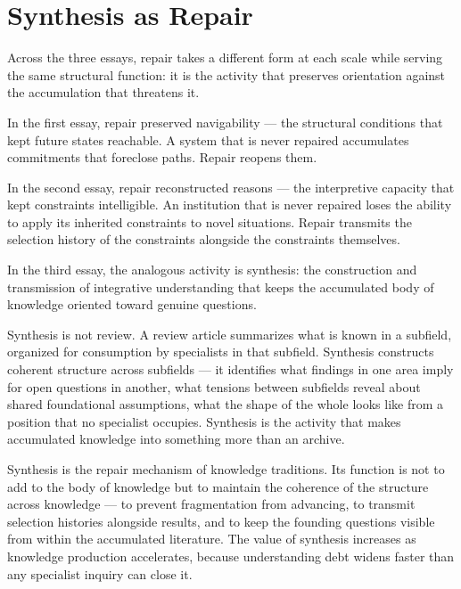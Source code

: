 \section{Synthesis as Repair}

Across the three essays, repair takes a different form at each scale while
serving the same structural function: it is the activity that preserves
orientation against the accumulation that threatens it.

In the first essay, repair preserved navigability --- the structural conditions
that kept future states reachable. A system that is never repaired accumulates
commitments that foreclose paths. Repair reopens them.

In the second essay, repair reconstructed reasons --- the interpretive capacity
that kept constraints intelligible. An institution that is never repaired
loses the ability to apply its inherited constraints to novel situations.
Repair transmits the selection history of the constraints alongside the
constraints themselves.

In the third essay, the analogous activity is synthesis: the construction
and transmission of integrative understanding that keeps the accumulated body
of knowledge oriented toward genuine questions.

Synthesis is not review. A review article summarizes what is known in a
subfield, organized for consumption by specialists in that subfield. Synthesis
constructs coherent structure across subfields --- it identifies what findings
in one area imply for open questions in another, what tensions between
subfields reveal about shared foundational assumptions, what the shape of
the whole looks like from a position that no specialist occupies. Synthesis
is the activity that makes accumulated knowledge into something more than
an archive.

\begin{principle}
Synthesis is the repair mechanism of knowledge traditions. Its function is
not to add to the body of knowledge but to maintain the coherence of the
structure across knowledge --- to prevent fragmentation from advancing,
to transmit selection histories alongside results, and to keep the founding
questions visible from within the accumulated literature. The value of
synthesis increases as knowledge production accelerates, because understanding
debt widens faster than any specialist inquiry can close it.
\end{principle}


